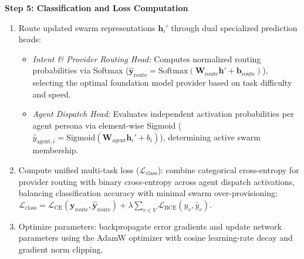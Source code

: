 \documentclass[11pt,a4paper]{article}
\begin{document}
\vspace{0.30em}
\textbf{Step 5: Classification and Loss Computation}
\begin{enumerate}[leftmargin=1.8em, itemsep=0.20em, topsep=0.05em]
    \item Route updated swarm representations $\mathbf{h}_i'$ through dual specialized prediction heads:
    \begin{itemize}[leftmargin=1.5em, itemsep=0.06em, topsep=0.03em, label=$\ast$]
        \item \textit{Intent \& Provider Routing Head:} Computes normalized routing probabilities via Softmax ($\hat{\mathbf{y}}_{\text{route}} = \mathrm{Softmax}(\mathbf{W}_{\text{route}} \mathbf{h}' + \mathbf{b}_{\text{route}})$), selecting the optimal foundation model provider based on task difficulty and speed.
        \item \textit{Agent Dispatch Head:} Evaluates independent activation probabilities per agent persona via element-wise Sigmoid ($\hat{y}_{\text{agent}, i} = \mathrm{Sigmoid}(\mathbf{W}_{\text{agent}} \mathbf{h}_i' + b_i)$), determining active swarm membership.
    \end{itemize}
    \item Compute unified multi-task loss ($\mathcal{L}_{\text{class}}$): combine categorical cross-entropy for provider routing with binary cross-entropy across agent dispatch activations, balancing classification accuracy with minimal swarm over-provisioning: $\mathcal{L}_{\text{class}} = \mathcal{L}_{\text{CE}}(\mathbf{y}_{\text{route}}, \hat{\mathbf{y}}_{\text{route}}) + \lambda \sum_{v \in V} \mathcal{L}_{\text{BCE}}(y_v, \hat{y}_v)$.
    \item Optimize parameters: backpropagate error gradients and update network parameters using the AdamW optimizer with cosine learning-rate decay and gradient norm clipping.
\end{enumerate}

\newpage

\end{document}
